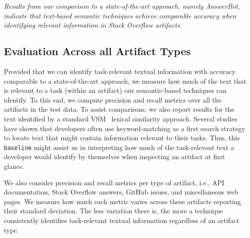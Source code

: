 





\medskip
\begin{bluequote}
    \textit{Results from our comparison to a state-of-the-art approach, namely AnswerBot, 
    indicate that text-based semantic techniques achieve comparable accuracy  
    when identifying relevant information in Stack Overflow artifacts.}
\end{bluequote}






\subsection{Evaluation Across all Artifact Types}
\label{cp5:results-all}





Provided that we can identify task-relevant textual information with accuracy comparable to a state-of-the-art approach, 
we measure how much of the text that is relevant to a task (within an artifact)
 our semantic-based techniques can identify.
To this end, we compute precision and recall metrics over all the artifacts in the test data. 
To assist comparisons, we also report results for the text identified by a
standard \acf{VSM}~\cite{Salton1975vsm} lexical similarity approach. Several studies~\cite{Ko2006a, Freund2015, marques2020}
have shown that developers often use keyword-matching as a first search strategy to locate text that might contain information relevant to their tasks.
Thus, this \texttt{baseline} might assist us in interpreting 
how much of the task-relevant text a developer would identify by themselves
when inspecting an artifact at first glance.


We also consider precision and recall metrics per type of artifact, i.e., API documentation, Stack Overflow answers, GitHub issues, and miscellaneous web pages.
We measure how much each metric varies across these artifacts reporting their standard deviation.
The less variation there is, the more a technique consistently identifies task-relevant textual information regardless of an artifact type.


